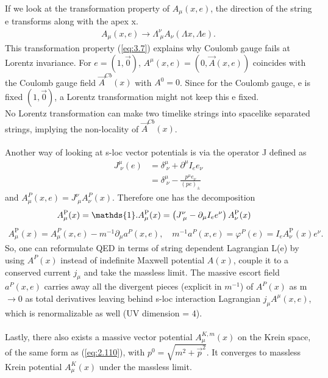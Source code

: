 \documentclass[12pt,a4paper]{article}
\numberwithin{equation}{section}
\begin{document}
If we look at the transformation property of $A_\mu(x,e)$, the direction of the string e transforms along with the apex x.
\begin{align}\label{eq:3.7}
A_\mu(x,e)\longrightarrow\Lambda^\nu_{\;\mu}A_\nu(\Lambda x,\Lambda e).
\end{align}
This transformation property (\ref{eq:3.7}) explains why Coulomb gauge fails at Lorentz invariance. For $e=(1,\vec{0})$, $A^\mu(x,e)=(0,\vec{A}(x,e))$ coincides with the Coulomb gauge field $\vec{A}^{Cb}(x)$ with $A^0=0$. Since for the Coulomb gauge, e is fixed $(1,\vec{0})$, a Lorentz transformation might not keep this e fixed. \\
No Lorentz transformation can make two timelike strings into spacelike separated strings, implying the non-locality of $\vec{A}^{Cb}(x)$.    \\\\
Another way of looking at s-loc vector potentials is via the operator J defined as 
\begin{align}
J^\mu_{\;\nu}(e)&=\delta^\mu_{\;\nu}+\partial^\mu I_ee_\nu \label{eq:3.8}\\
&=\delta^\mu_{\;\nu}-\frac{p^\mu e_\nu}{(pe)_\pm}
\end{align}
and $A^P_\mu(x,e)=J^\nu_{\;\mu} A^P_\nu(x)$. Therefore one has the decomposition 
\begin{align*}
A_{\mu}^{\mathrm{P}}(x)&=\mathds{1}.A_{\mu}^{\mathrm{P}}(x)=\left(J^\nu_{\;\mu}-\partial_\mu I_e e^\nu\right)A_{\nu}^{\mathrm{P}}(x)\notag\end{align*}
\begin{align}
A_{\mu}^{\mathrm{P}}(x)=A^P_{\mu}(x, e)-m^{-1} \partial_{\mu} a^P(x, e), \quad m^{-1}a^P(x,e)=\varphi^P(e)=I_eA_{\nu}^{\mathrm{P}}(x)e^\nu.
\end{align}
So, one can reformulate QED in terms of string dependent Lagrangian L(e) by using $A^P(x)$ instead of indefinite Maxwell potential $A(x)$, couple it to a conserved current $j_\mu$ and take the massless limit. The massive escort field $a^P(x,e)$ carries away all the divergent pieces (explicit in $m^{-1}$) of $A^P(x)$ as m$\rightarrow 0$ as total derivatives leaving behind s-loc interaction Lagrangian $j_\mu A^\mu(x,e)$, which is renormalizable as well (UV dimension = 4).\\\\
Lastly, there also exists a massive vector potential $A^{K,m}_\mu(x)$ on the Krein space, of the same form as (\ref{eq:2.110}), with $p^0=\sqrt{m^2+\vec{p}^2}$. It converges to massless Krein potential $A^K_\mu(x)$ under the massless limit. \\\\
\end{document}
